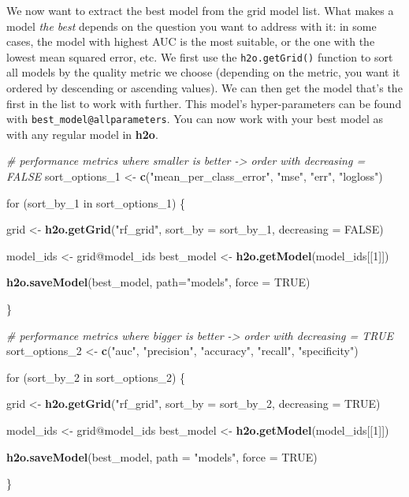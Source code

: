\documentclass[]{article}
\newenvironment{Shaded}{\begin{snugshade}}{\end{snugshade}}
\newcommand{\KeywordTok}[1]{\textcolor[rgb]{0.13,0.29,0.53}{\textbf{{#1}}}}
\newcommand{\DataTypeTok}[1]{\textcolor[rgb]{0.13,0.29,0.53}{{#1}}}
\newcommand{\DecValTok}[1]{\textcolor[rgb]{0.00,0.00,0.81}{{#1}}}
\newcommand{\StringTok}[1]{\textcolor[rgb]{0.31,0.60,0.02}{{#1}}}
\newcommand{\CommentTok}[1]{\textcolor[rgb]{0.56,0.35,0.01}{\textit{{#1}}}}
\newcommand{\OtherTok}[1]{\textcolor[rgb]{0.56,0.35,0.01}{{#1}}}
\newcommand{\NormalTok}[1]{{#1}}
\begin{document}
We now want to extract the best model from the grid model list. What
makes a model \emph{the best} depends on the question you want to
address with it: in some cases, the model with highest AUC is the most
suitable, or the one with the lowest mean squared error, etc. We first
use the \texttt{h2o.getGrid()} function to sort all models by the
quality metric we choose (depending on the metric, you want it ordered
by descending or ascending values). We can then get the model that's the
first in the list to work with further. This model's hyper-parameters
can be found with \texttt{best\_model@allparameters}. You can now work
with your best model as with any regular model in \textbf{h2o}.

\begin{Shaded}
\begin{Highlighting}[]
\CommentTok{# performance metrics where smaller is better -> order with decreasing = FALSE}
\NormalTok{sort_options_1 <-}\StringTok{ }\KeywordTok{c}\NormalTok{(}\StringTok{"mean_per_class_error"}\NormalTok{, }\StringTok{"mse"}\NormalTok{, }\StringTok{"err"}\NormalTok{, }\StringTok{"logloss"}\NormalTok{)}

\NormalTok{for (sort_by_1 in sort_options_1) \{}
  
  \NormalTok{grid <-}\StringTok{ }\KeywordTok{h2o.getGrid}\NormalTok{(}\StringTok{"rf_grid"}\NormalTok{, }\DataTypeTok{sort_by =} \NormalTok{sort_by_1, }\DataTypeTok{decreasing =} \OtherTok{FALSE}\NormalTok{)}
  
  \NormalTok{model_ids <-}\StringTok{ }\NormalTok{grid@model_ids}
  \NormalTok{best_model <-}\StringTok{ }\KeywordTok{h2o.getModel}\NormalTok{(model_ids[[}\DecValTok{1}\NormalTok{]])}
  
  \KeywordTok{h2o.saveModel}\NormalTok{(best_model, }\DataTypeTok{path=}\StringTok{"models"}\NormalTok{, }\DataTypeTok{force =} \OtherTok{TRUE}\NormalTok{)}
  
\NormalTok{\}}


\CommentTok{# performance metrics where bigger is better -> order with decreasing = TRUE}
\NormalTok{sort_options_2 <-}\StringTok{ }\KeywordTok{c}\NormalTok{(}\StringTok{"auc"}\NormalTok{, }\StringTok{"precision"}\NormalTok{, }\StringTok{"accuracy"}\NormalTok{, }\StringTok{"recall"}\NormalTok{, }\StringTok{"specificity"}\NormalTok{)}

\NormalTok{for (sort_by_2 in sort_options_2) \{}
  
  \NormalTok{grid <-}\StringTok{ }\KeywordTok{h2o.getGrid}\NormalTok{(}\StringTok{"rf_grid"}\NormalTok{, }\DataTypeTok{sort_by =} \NormalTok{sort_by_2, }\DataTypeTok{decreasing =} \OtherTok{TRUE}\NormalTok{)}
  
  \NormalTok{model_ids <-}\StringTok{ }\NormalTok{grid@model_ids}
  \NormalTok{best_model <-}\StringTok{ }\KeywordTok{h2o.getModel}\NormalTok{(model_ids[[}\DecValTok{1}\NormalTok{]])}
  
  \KeywordTok{h2o.saveModel}\NormalTok{(best_model, }\DataTypeTok{path =} \StringTok{"models"}\NormalTok{, }\DataTypeTok{force =} \OtherTok{TRUE}\NormalTok{)}
  
\NormalTok{\}}
\end{Highlighting}
\end{Shaded}
\end{document}
